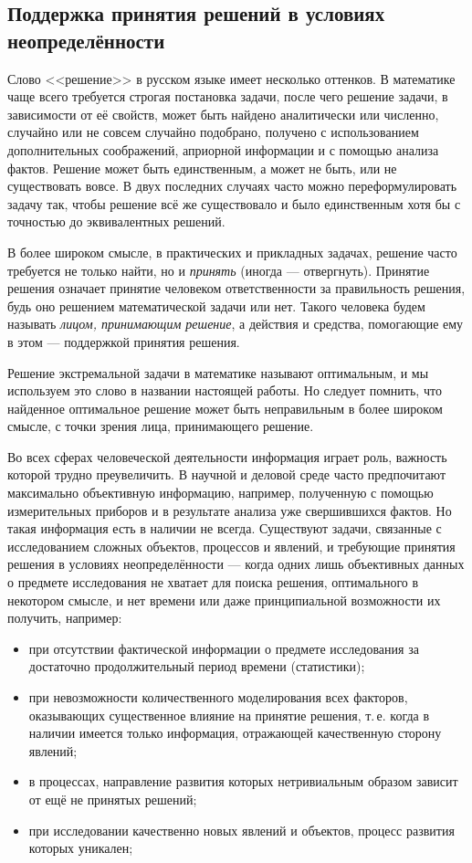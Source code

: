 
\subsection{Поддержка принятия решений в условиях неопределённости}
\label{sec:basic_intro}

Слово <<решение>> в русском языке имеет несколько оттенков. В математике чаще всего требуется строгая постановка задачи, после чего решение задачи, в зависимости от её свойств, может быть найдено аналитически или численно, случайно или не совсем случайно подобрано, получено с использованием дополнительных соображений,  априорной информации и с помощью анализа фактов. Решение может быть единственным, а может не быть, или не существовать вовсе. В двух последних случаях часто можно переформулировать задачу так, чтобы решение всё же существовало и было единственным хотя бы с точностью до эквивалентных решений. 

В более широком смысле, в практических и прикладных задачах, решение часто требуется не только найти, но и {\sl принять} (иногда --- отвергнуть). Принятие решения означает принятие человеком ответственности за правильность решения, будь оно решением математической задачи или нет. Такого человека будем называть {\sl лицом, принимающим решение}, а действия и средства, помогающие ему в этом ---  поддержкой принятия решения. 

Решение экстремальной задачи в математике называют оптимальным, и мы используем это слово в названии настоящей работы. Но следует помнить, что найденное оптимальное решение может быть неправильным в более широком смысле, с точки зрения лица, принимающего решение. 

Во всех сферах человеческой деятельности информация играет роль, важность которой трудно преувеличить. В научной и деловой среде часто предпочитают максимально объективную информацию, например, полученную с помощью измерительных приборов и в результате анализа уже свершившихся фактов. Но такая информация есть в наличии не всегда. Существуют задачи, связанные с исследованием сложных объектов, процессов и явлений, и требующие принятия решения в условиях неопределённости --- когда одних лишь объективных данных о предмете исследования не хватает для поиска решения, оптимального в некотором смысле, и нет времени или даже принципиальной возможности их  получить, например: 
\begin{itemize}
 \item при отсутствии фактической информации о предмете исследования за достаточно продолжительный период времени (статистики);
 \item при невозможности количественного моделирования всех факторов, оказывающих существенное влияние на принятие решения, т.\,е. когда в наличии имеется только информация, отражающей качественную сторону явлений; 
 \item в процессах, направление развития которых нетривиальным образом зависит от ещё не принятых решений;
 \item при исследовании качественно новых явлений и объектов, процесс развития которых уникален;
\end{itemize}

